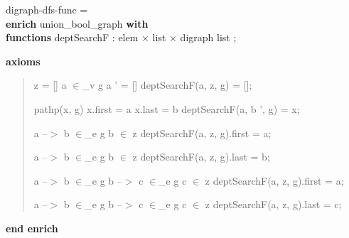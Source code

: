 \begin{tabbing}\label{digraph-dfs-func-spec}%
digraph-dfs-func = \\
{\bf enr}\={\bf ich} union\_bool\_graph {\bf with}\+\\
{\bf functions} deptSearchF  : elem $\times$ list $\times$ digraph \Imp  list ;
\end{tabbing}
{\bf axioms}



\begin{quote}
z = [] \And a $\in$\_v g \Or a ' = [] \Imp deptSearchF(a, z, g) = [];

pathp(x, g) \And x.first = a \And x.last = b \Imp deptSearchF(a, b ', g) = x;

a --$>$ b $\in$\_e g \And b $\in$ z \Imp deptSearchF(a, z, g).first = a;

a --$>$ b $\in$\_e g \And b $\in$ z \Imp deptSearchF(a, z, g).last = b;

a --$>$ b $\in$\_e g \And b --$>$ c $\in$\_e g \And c $\in$ z \Imp deptSearchF(a, z, g).first = a;

a --$>$ b $\in$\_e g \And b --$>$ c $\in$\_e g \And c $\in$ z \Imp deptSearchF(a, z, g).last = c;


\end{quote}
{\bf end enrich}

